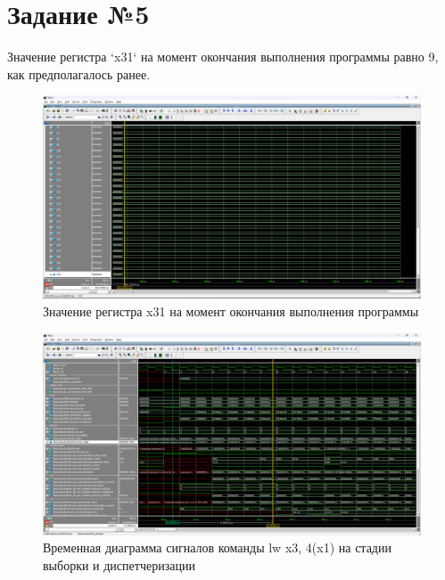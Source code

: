 \chapter{Задание №5}

Значение регистра `x31` на момент окончания выполнения программы равно 9, как предполагалось ранее.

\begin{figure}
    \centering
    \includegraphics[width=1\linewidth]{images/05-x31_finally.png}
    \caption{Значение регистра x31 на момент окончания выполнения программы}
    \label{fig:05-x31_finally}
\end{figure}

\begin{figure}
    \centering
    \includegraphics[width=1\linewidth]{images/05-fetch.png}
    \caption{Временная диаграмма сигналов команды lw x3, 4(x1) на стадии выборки и диспетчеризации}
    \label{fig:05-fetch}
\end{figure}

